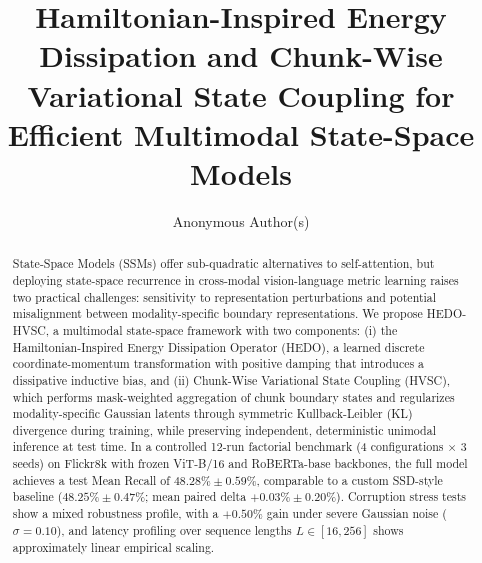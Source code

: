 \documentclass[runningheads,a4paper]{llncs}
\begin{document}
\title{Hamiltonian-Inspired Energy Dissipation and Chunk-Wise Variational State Coupling for Efficient Multimodal State-Space Models}

\author{Anonymous Author(s)}

\maketitle

\begin{abstract}
State-Space Models (SSMs) offer sub-quadratic alternatives to self-attention, but deploying state-space recurrence in cross-modal vision-language metric learning raises two practical challenges: sensitivity to representation perturbations and potential misalignment between modality-specific boundary representations. We propose HEDO-HVSC, a multimodal state-space framework with two components: (i) the Hamiltonian-Inspired Energy Dissipation Operator (HEDO), a learned discrete coordinate-momentum transformation with positive damping that introduces a dissipative inductive bias, and (ii) Chunk-Wise Variational State Coupling (HVSC), which performs mask-weighted aggregation of chunk boundary states and regularizes modality-specific Gaussian latents through symmetric Kullback-Leibler (KL) divergence during training, while preserving independent, deterministic unimodal inference at test time. In a controlled 12-run factorial benchmark (4 configurations $\times$ 3 seeds) on Flickr8k with frozen ViT-B/16 and RoBERTa-base backbones, the full model achieves a test Mean Recall of $48.28\% \pm 0.59\%$, comparable to a custom SSD-style baseline ($48.25\% \pm 0.47\%$; mean paired delta $+0.03\% \pm 0.20\%$). Corruption stress tests show a mixed robustness profile, with a $+0.50\%$ gain under severe Gaussian noise ($\sigma=0.10$), and latency profiling over sequence lengths $L \in [16, 256]$ shows approximately linear empirical scaling.

\end{abstract}

\end{document}
